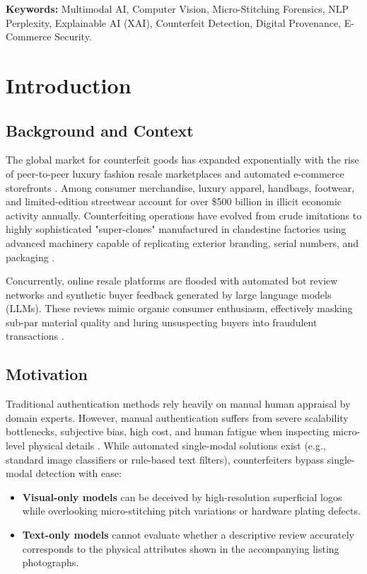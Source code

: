 \documentclass[a4paper,12pt]{report}
\begin{document}
\vspace{0.5cm}
\noindent \textbf{Keywords:} Multimodal AI, Computer Vision, Micro-Stitching Forensics, NLP Perplexity, Explainable AI (XAI), Counterfeit Detection, Digital Provenance, E-Commerce Security.

\newpage
\tableofcontents
\newpage
\listoffigures
\newpage
\listoftables

\newpage

\chapter{Introduction}

\section{Background and Context}
The global market for counterfeit goods has expanded exponentially with the rise of peer-to-peer luxury fashion resale marketplaces and automated e-commerce storefronts \cite{oecd2020trade}. Among consumer merchandise, luxury apparel, handbags, footwear, and limited-edition streetwear account for over \$500 billion in illicit economic activity annually. Counterfeiting operations have evolved from crude imitations to highly sophisticated "super-clones" manufactured in clandestine factories using advanced machinery capable of replicating exterior branding, serial numbers, and packaging \cite{smith2022computer}.

Concurrently, online resale platforms are flooded with automated bot review networks and synthetic buyer feedback generated by large language models (LLMs). These reviews mimic organic consumer enthusiasm, effectively masking sub-par material quality and luring unsuspecting buyers into fraudulent transactions \cite{zhang2023nlp}.

\section{Motivation}
Traditional authentication methods rely heavily on manual human appraisal by domain experts. However, manual authentication suffers from severe scalability bottlenecks, subjective bias, high cost, and human fatigue when inspecting micro-level physical details \cite{patel2023deep}. While automated single-modal solutions exist (e.g., standard image classifiers or rule-based text filters), counterfeiters bypass single-modal detection with ease:
\begin{itemize}
    \item \textbf{Visual-only models} can be deceived by high-resolution superficial logos while overlooking micro-stitching pitch variations or hardware plating defects.
    \item \textbf{Text-only models} cannot evaluate whether a descriptive review accurately corresponds to the physical attributes shown in the accompanying listing photographs.
\end{itemize}
\end{document}
